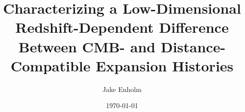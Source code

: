 \documentclass[11pt]{article}
\title{%
  Characterizing a Low-Dimensional Redshift-Dependent Difference
  Between CMB- and Distance-Compatible Expansion Histories
}
\author{Jake Enholm}
\date{\today}
\begin{document}
\maketitle

\begin{abstract}

\end{abstract}








\FloatBarrier




\clearpage\appendix




\clearpage
\end{document}
